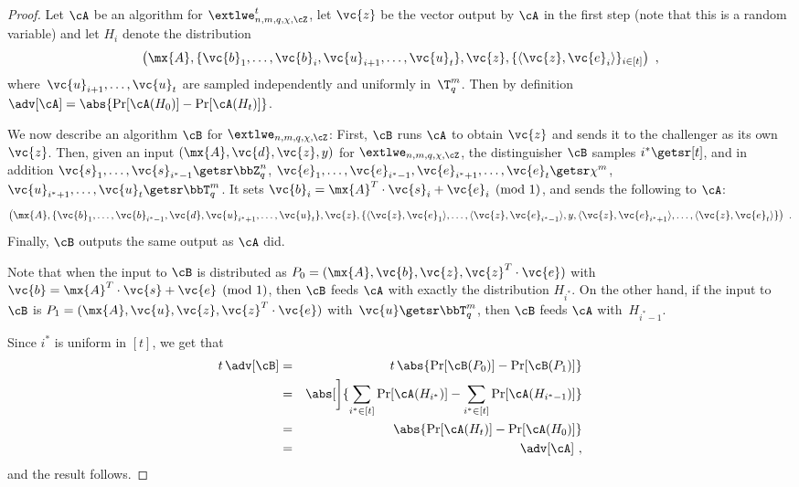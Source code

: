 \begin{proof}
Let $\cA$ be an algorithm for $\extlwe^t_{n,m,q,\chi,\cZ}$, let $\vc{z}$ be the vector output by $\cA$ in the first step (note that this is a random variable) and let $H_i$ denote the distribution
\[
\left(\mx{A}, \{\vc{b}_1, \ldots, \vc{b}_i, \vc{u}_{i+1}, \dots, \vc{u}_t\}, \vc{z}, \{\langle\vc{z}, \vc{e}_i\rangle\}_{i\in[t]} \right)~,\]
where~$\vc{u}_{i+1}, \dots, \vc{u}_t$ are sampled independently and uniformly in~$\T_q^m$.
Then by definition $\adv[\cA] = \abs{\Pr[\cA(H_0)]- \Pr[\cA(H_t)]}$.

We now describe an algorithm $\cB$ for $\extlwe_{n,m,q,\chi,\cZ}$: First, $\cB$ runs $\cA$ to obtain $\vc{z}$ and sends it to the challenger as its own $\vc{z}$. Then, given an input $(\mx{A}, \vc{d}, \vc{z}, y)$ for $\extlwe_{n,m,q,\chi,\cZ}$, the distinguisher $\cB$ samples $i^* \getsr [t]$, and in addition $\vc{s}_1, \ldots, \vc{s}_{i^*-1}\getsr \bbZ^n_q$, $\vc{e}_1, \ldots, \vc{e}_{i^*-1}, \vc{e}_{i^*+1}, \ldots, \vc{e}_t \getsr \chi^m$, $\vc{u}_{i^*+1}, \ldots, \vc{u}_t \getsr \bbT_q^m$. It sets $\vc{b}_i = \mx{A}^T\cdot\vc{s}_i+\vc{e}_i\pmod{1}$, and sends the following to $\cA$:
\[
\left(\mx{A}, \{ \vc{b}_1, \ldots, \vc{b}_{i^*-1}, \vc{d}, \vc{u}_{i^*+1}, \ldots, \vc{u}_t\}, \vc{z}, \{\langle\vc{z},\vc{e}_1\rangle, \ldots,\langle\vc{z}, \vc{e}_{i^*-1}\rangle, y, \langle\vc{z}, \vc{e}_{i^*+1}\rangle, \ldots, \langle\vc{z}, \vc{e}_t\rangle  \} \right)~.
\]
Finally, $\cB$ outputs the same output as $\cA$ did.

Note that when the input to $\cB$ is distributed as $P_0=(\mx{A}, \vc{b}, \vc{z}, \vc{z}^T \cdot \vc{e})$ with~$\vc{b} = \mx{A}^T\cdot\vc{s}+\vc{e}\pmod{1}$, then $\cB$ feeds $\cA$ with exactly the distribution $H_{i^*}$. On the other hand, if the input to $\cB$ is $P_1 = (\mx{A}, \vc{u}, \vc{z}, \vc{z}^T \cdot \vc{e})$ with~$\vc{u} \getsr \bbT_q^m$, then $\cB$ feeds $\cA$ with~$H_{i^*-1}$.

Since $i^*$ is uniform in $[t]$, we get that
\begin{eqnarray*}
t \, \adv[\cB] & = & t \, \abs{\Pr[\cB(P_0)] - \Pr[\cB(P_1)]}\\
  & = &
	\abs[\bigg]{{\sum_{i^*\in[t]} \Pr[\cA(H_{i^*})] - \sum_{i^*\in[t]} \Pr[\cA(H_{i^*-1})]}} \\
	& = &
	\abs{\Pr[\cA(H_{t})]- \Pr[\cA(H_{0})] } \\
	& = & \adv[\cA]~,
\end{eqnarray*}
and the result follows.
\end{proof}




